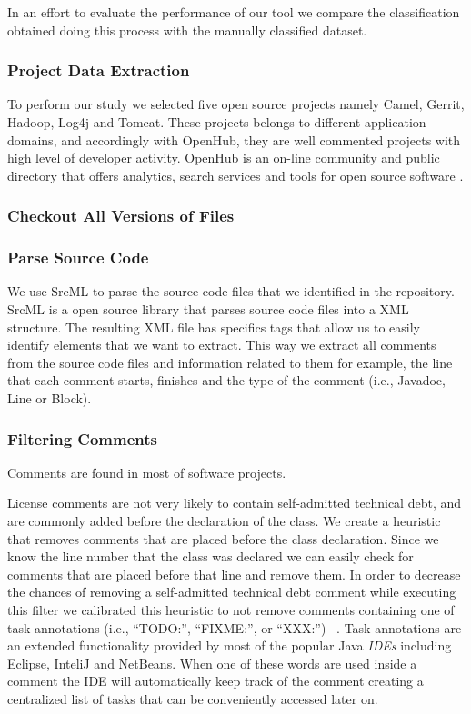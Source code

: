 In an effort to evaluate the performance of our tool we compare the \SATD classification obtained doing this process with the manually classified dataset. 

\subsubsection*{Project Data Extraction}
\label{subsub:project_data_extraction}

To perform our study we selected five open source projects namely Camel, Gerrit, Hadoop, Log4j and Tomcat. These projects belongs to different application domains, and accordingly with OpenHub, they are well commented projects  with high level of developer activity. OpenHub is an on-line community and public directory that offers analytics, search services and tools for open source software \cite{Openhub:home}.

\subsubsection*{Checkout All Versions of Files}
\label{subsub:checkout_all_versions_of_files}

\subsubsection*{Parse Source Code}
\label{subsub:parse_source_code}

We use SrcML \cite{srcml} to parse the source code files that we identified in the repository. SrcML is a open source library that parses source code files into a XML structure. The resulting XML file has specifics tags that allow us to easily identify elements that we want to extract. This way we extract all comments from the source code files and information related to them for example, the line that each comment starts, finishes and the type of the comment (i.e., Javadoc, Line or Block).

\subsubsection*{Filtering Comments}
\label{subsub:filtering_comments}

Comments are found in most of software projects.

License comments are not very likely to contain self-admitted technical debt, and are commonly added before the declaration of the class. We create a heuristic that removes comments that are placed before the class declaration. Since we know the line number that the class was declared we can easily check for comments that are placed before that line and remove them. In order to decrease the chances of removing a self-admitted technical debt comment while executing this filter we calibrated this heuristic to not remove comments containing one of task annotations (i.e., ``TODO:'', ``FIXME:'', or ``XXX:'') ~\cite{Storey2008ICSE}. Task annotations are an extended functionality provided by most of the popular Java \textit{IDEs} including Eclipse, InteliJ and NetBeans. When one of these words are used inside a comment the IDE will automatically keep track of the comment creating a centralized list of tasks that can be conveniently accessed later on.

